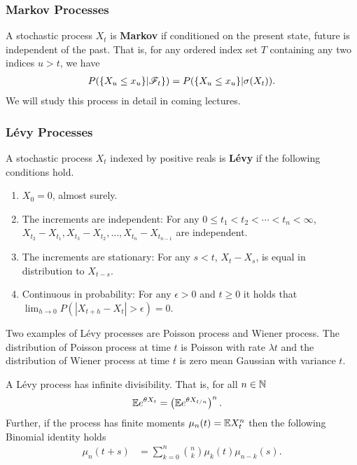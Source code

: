 \documentclass[letterpaper,10pt,english]{article}
\begin{document}
\subsubsection{Markov Processes}
A stochastic process $X_t$ is \textbf{Markov} if conditioned on the present state, future is independent of the past.  
That is, for any ordered index set $T$ containing any two indices $u > t$, we have  %
\begin{align*}
P(\{X_u \leq x_u\}| \mathscr{F}_t\}) = P(\{X_{u} \leq x_u\}| \sigma(X_t)).
\end{align*}
We will study this process in detail in coming lectures. 

\subsubsection{L\'evy Processes}
A stochastic process $X_t$ indexed by positive reals is \textbf{L\'evy} if the following conditions hold. 
\begin{enumerate}[i\_]
\item $X_{0}=0$, almost surely.
\item The increments are independent: For any $ 0\leq t_{1}<t_{2}<\cdots <t_{n}<\infty$, $X_{t_{2}}-X_{t_{1}},X_{t_{3}}-X_{t_{2}},\ldots ,X_{t_{n}}-X_{t_{n-1}}$ are independent.
\item The increments are stationary: For any $s<t$,  $X_{t}-X_{s}$, is equal in distribution to $X_{t-s}$.
\item Continuous in probability: For any $\epsilon > 0$ and $t\geq 0$ it holds that $\lim _{h\rightarrow 0}P(|X_{t+h}-X_{t}|>\epsilon )=0$. 
\end{enumerate}
\begin{shaded*}
\begin{exmp}
Two examples of L\'evy processes are Poisson process and Wiener process. 
The distribution of Poisson process at time $t$ is Poisson with rate $\lambda t$ and the distribution of Wiener process at time $t$ is zero mean Gaussian with variance $t$. 
\end{exmp}
\end{shaded*}
\begin{thm} A L\'evy process has infinite divisibility. 
That is, for all $n \in \mathbb{N}$ %
\begin{align*}
\mathbb{E} e^{\theta X_t} &= \left(\mathbb{E} e^{\theta X_{{t}/{n}}}\right)^n.
\end{align*}
Further, if the process has finite moments $\mu_n(t) = \mathbb{E} X_t^n$ then the following Binomial identity holds
\begin{align*}
\mu_n(t+s) &= \sum_{k=0}^n\binom{n}{k}\mu_k(t)\mu_{n-k}(s).
\end{align*}
\end{thm}
\end{document}
